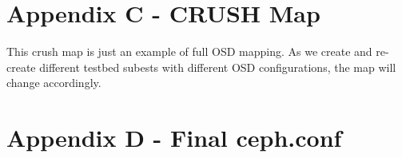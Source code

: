 \documentclass{article}
\begin{document}


\section*{Appendix C - CRUSH Map}

This crush map is just an example of full OSD mapping. As we create and
re-create different testbed subests with different OSD configurations, the map will
change accordingly.




\section*{Appendix D - Final ceph.conf}


\end{document}

